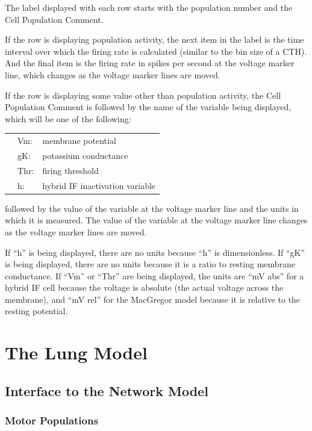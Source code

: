 \documentclass[12pt,openany,oneside]{book}
\newcommand{\inquotes}[1]{{{``#1''}}}
\begin{document}
The label displayed with each row starts with the population number
and the Cell Population Comment.

If the row is displaying population activity, the next item in the
label is the time interval over which the firing rate is calculated
(similar to the bin size of a CTH). And the final item is the firing
rate in spikes per second at the voltage marker line, which changes as
the voltage marker lines are moved.
\filbreak

If the row is displaying some value other than population activity,
the Cell Population Comment is followed by the name of the variable
being displayed, which will be one of the following:
\begin{flushleft}
\begin{tabular}{@{}lll@{}}
& Vm: & membrane potential\\
& gK: & potassium conductance\\
& Thr: & firing threshold\\
& h: & hybrid IF inactivation variable\\
\end{tabular}
\end{flushleft}
\noindent followed by the value of the variable at the voltage marker line and
the units in which it is measured. The value of the variable at the
voltage marker line changes as the voltage marker lines are moved.

If \inquotes{h} is being displayed, there are no units because
\inquotes{h} is
dimensionless. If \inquotes{gK} is being displayed, there are no units
because it is a ratio to resting membrane conductance. If \inquotes{Vm} or
\inquotes{Thr} are being displayed, the units are \inquotes{mV abs} for a hybrid IF
cell because the voltage is absolute (the actual voltage across the
membrane), and \inquotes{mV rel} for the MacGregor model because it is
relative to the resting potential.

\clearpage
\section{The Lung Model}
\label{The Lung Model}

\subsection{Interface to the Network Model}

\subsubsection{Motor Populations}
\end{document}
